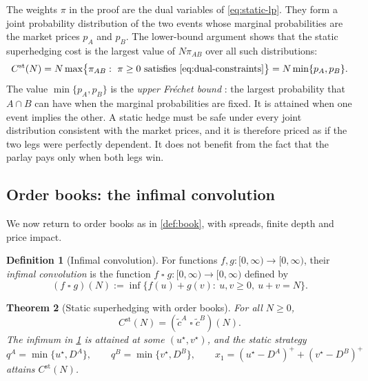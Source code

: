 \documentclass[11pt,a4paper]{article}
\theoremstyle{plain}
\newtheorem{theorem}{Theorem}[section]
\theoremstyle{definition}
\newtheorem{definition}[theorem]{Definition}
\theoremstyle{remark}
\newcommand{\1}{\mathbf{1}}
\newcommand{\infconv}{\mathbin{\square}}
\begin{document}
The weights $\pi$ in the proof are the dual variables of \eqref{eq:static-lp}. They form a joint probability distribution of the two events whose marginal probabilities are the market prices $p_A$ and $p_B$. The lower-bound argument shows that the static superhedging cost is the largest value of $N\pi_{AB}$ over all such distributions:
\[
C^{\mathrm{st}}(N) = N\max\bigl\{\pi_{AB}:\ \pi\geq 0 \text{ satisfies \eqref{eq:dual-constraints}}\bigr\} = N\min\{p_A,p_B\}.
\]
The value $\min\{p_A,p_B\}$ is the \emph{upper Fréchet bound} \cite{Frechet1951}: the largest probability that $A\cap B$ can have when the marginal probabilities are fixed. It is attained when one event implies the other. A static hedge must be safe under every joint distribution consistent with the market prices, and it is therefore priced as if the two legs were perfectly dependent. It does not benefit from the fact that the parlay pays only when both legs win.

\subsection{Order books: the infimal convolution}

We now return to order books as in \cref{def:book}, with spreads, finite depth and price impact.

\begin{definition}[Infimal convolution]
\label{def:infconv}
For functions $f,g:[0,\infty)\to[0,\infty)$, their \emph{infimal convolution} \cite{Rockafellar1970} is the function $f\infconv g:[0,\infty)\to[0,\infty)$ defined by
\[
(f\infconv g)(N) := \inf\bigl\{f(u)+g(v):\ u,v\geq 0,\ u+v=N\bigr\}.
\]
\end{definition}

\begin{theorem}[Static superhedging with order books]
\label{thm:static-books}
For all $N\geq 0$,
\[
C^{\mathrm{st}}(N) = (\tilde c^A\infconv\tilde c^B)(N).
\]
The infimum in \cref{def:infconv} is attained at some $(u^\star,v^\star)$, and the static strategy
\[
q^A = \min\{u^\star,D^A\},\qquad q^B = \min\{v^\star,D^B\},\qquad x_1 = (u^\star-D^A)^+ + (v^\star-D^B)^+
\]
attains $C^{\mathrm{st}}(N)$.
\end{theorem}
\end{document}
